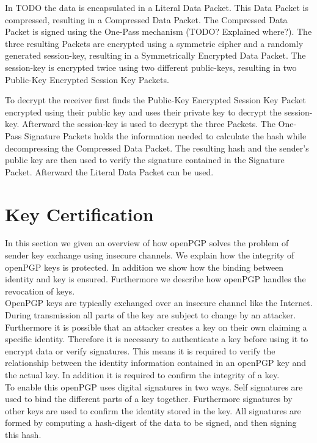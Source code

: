 

In TODO the data is encapsulated in a Literal Data Packet. This Data Packet is compressed, resulting in a Compressed Data Packet. The Compressed Data Packet is signed using the One-Pass mechanism (TODO? Explained where?). The three resulting Packets are encrypted using a symmetric cipher and a randomly generated session-key, resulting in a Symmetrically Encrypted Data Packet. The session-key is encrypted twice using two different public-keys, resulting in two Public-Key Encrypted Session Key Packets.


To decrypt the receiver first finds the Public-Key Encrypted Session Key Packet encrypted using their public key and uses their private key to decrypt the session-key. Afterward the session-key is used to decrypt the three Packets. The One-Pass Signature Packets holds the information needed to calculate the hash while decompressing the Compressed Data Packet. The resulting hash and the sender's public key are then used to verify the signature contained in the Signature Packet. Afterward the Literal Data Packet can be used.

\section{Key Certification}

In this section we given an overview of how openPGP solves the problem of sender key exchange using insecure channels. We explain how the integrity of openPGP keys is protected. In addition we show how the binding between identity and key is ensured. Furthermore we describe how openPGP handles the revocation of keys. \\

OpenPGP keys are typically exchanged over an insecure channel like the Internet. During transmission all parts of the key are subject to change by an attacker. Furthermore it is possible that an attacker creates a key on their own claiming a specific identity. Therefore it is necessary to authenticate a key before using it to encrypt data or verify signatures.
This means it is required to verify the relationship between the identity information contained in an openPGP key and the actual key. In addition it is required to confirm the integrity of a key. \\

To enable this openPGP uses digital signatures in two ways. Self signatures are used to bind the different parts of a key together. Furthermore signatures by other keys are used to confirm the identity stored in the key. All signatures are formed by computing a hash-digest of the data to be signed, and then signing this hash.


